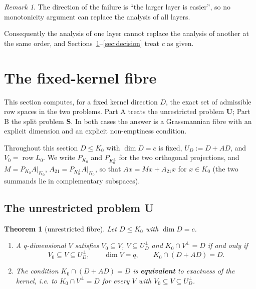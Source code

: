 \documentclass[journal]{IEEEtran}
\theoremstyle{plainn}
\newtheorem{thm}{Theorem}
\theoremstyle{remark}
\newtheorem{remark}{Remark}
\newcommand{\row}{\operatorname{row}}
\begin{document}
\begin{remark}\label{rem:direction}
The direction of the failure is ``the larger layer is easier'', so no monotonicity argument can replace
the analysis of all layers.
\end{remark}

Consequently the analysis of one layer cannot replace the analysis of another at the same order, and
Sections~\ref{sec:fibres}--\ref{sec:decision} treat $c$ as given.

\section{The fixed-kernel fibre}\label{sec:fibres}

This section computes, for a fixed kernel direction $D$, the exact set of admissible row spaces in the two
problems. Part A treats the unrestricted problem \textbf{U}; Part B the split problem \textbf{S}. In both
cases the answer is a Grassmannian fibre with an explicit dimension and an explicit non-emptiness
condition.

Throughout this section $D\le K_0$ with $\dim D=c$ is fixed, $U_D:=D+AD$, and $V_0=\row L_0$. We write
$P_{K_0}$ and $P_{K_0^\perp}$ for the two orthogonal projections, and $M=P_{K_0}A|_{K_0}$,
$A_{21}=P_{K_0^\perp}A|_{K_0}$, so that $Ax=Mx+A_{21}x$ for $x\in K_0$ (the two summands lie in
complementary subspaces).

\subsection{The unrestricted problem \texorpdfstring{\textbf{U}}{U}}\label{sec:fibres:u}

\begin{thm}[unrestricted fibre]\label{thm:ufibre}
Let $D\le K_0$ with $\dim D=c$.
\begin{enumerate}[label=\arabic*.,leftmargin=*,itemsep=1pt,topsep=2pt]
\item A $q$-dimensional $V$ satisfies $V_0\subseteq V$, $V\subseteq U_D^\perp$ and $K_0\cap V^\perp=D$ if
and only if
\[
V_0\subseteq V\subseteq U_D^\perp,\qquad \dim V=q,\qquad K_0\cap(D+AD)=D .
\]
\item The condition $K_0\cap(D+AD)=D$ is \textbf{equivalent} to exactness of the kernel, i.e. to
$K_0\cap V^\perp=D$ for every $V$ with $V_0\subseteq V\subseteq U_D^\perp$.
\end{enumerate}
\end{thm}
\end{document}
